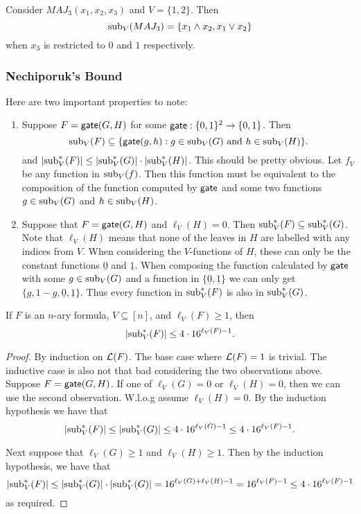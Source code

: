 \documentclass[11pt]{article}
\begin{document}
	\begin{example}
		Consider $MAJ_3(x_1, x_2, x_3)$ and $V = \{1, 2\}$. Then 
		\[\mathrm{sub}_V(MAJ_3) = \{x_1 \land x_2, x_1 \lor x_2\}\]
		when $x_3$ is restricted to $0$ and $1$ respectively. 
	\end{example}
	
	\subsubsection{Nechiporuk's Bound}
	Here are two important properties to note:
	\begin{enumerate}
		\item Suppose $F = \mathsf{gate}(G,H)$ for some $\mathsf{gate}: \{0,1\}^2 \rightarrow \{0,1\}$. Then 
		\[\mathrm{sub}_V(F) \subseteq \{\mathsf{gate}(g, h): g \in \mathrm{sub}_V(G) \mbox{ and } h \in \mathrm{sub}_V(H)\}.\]
		and $|\mathrm{sub}_V^*(F)| \leq |\mathrm{sub}_V^*(G)| \cdot |\mathrm{sub}_V^*(H)|$. This should be pretty obvious. Let $f_V$ be any function in $\mathrm{sub}_V(f)$. Then this function must be equivalent to the composition of the function computed by $\mathsf{gate}$ and some two functions $g \in \mathrm{sub}_V(G)$ and $h \in \mathrm{sub}_V(H)$.
		\item Suppose that $F = \mathsf{gate}(G, H)$ and $\ell_V(H) = 0$. Then $\mathrm{sub}_V^*(F) \subseteq \mathrm{sub}_V^*(G)$. Note that $\ell_V(H)$ means that none of the leaves in $H$ are labelled with any indices from $V$. When considering the $V$-functions of $H$, these can only be the constant functions $\underline{0}$ and $\underline{1}$. When composing the function calculated by $\mathsf{gate}$ with some $g \in \mathrm{sub}_V(G)$ and a function in $\{\underline{0}, \underline{1}\}$ we can only get $\{g, 1-g, \underline{0}, \underline{1}\}$. Thus every function in $\mathrm{sub}_V^*(F)$ is also in $\mathrm{sub}_V^{*}(G)$.
	\end{enumerate}
	
	\begin{lemma}
		\label{lem:U-Vsubfunctions}
		If $F$ is an $n$-ary formula, $V \subseteq [n]$, and $\ell_{V}(F) \geq 1$, then \[|\mathrm{sub}_V^*(F)| \leq 4 \cdot 16^{\ell_V(F) - 1}.\] 
	\end{lemma}
	\begin{proof}
		By induction on $\mathcal{L}(F)$. The base case where $\mathcal{L}(F) = 1$ is trivial. The inductive case is also not that bad considering the two observations above. Suppose $F = \mathsf{gate}(G, H)$. If one of $\ell_V(G) = 0$ or $\ell_V(H) = 0$, then we can use the second observation. W.l.o.g assume $\ell_V(H) = 0$. By the induction hypothesis we have that  
		\[|\mathrm{sub}_V^{*}(F)| \leq |\mathrm{sub}_V^*(G)| \leq 4 \cdot 16^{\ell_V(G) - 1} \leq 4 \cdot 16^{\ell_V(F) - 1}.\]
		
		Next suppose that $\ell_V(G) \geq 1$ and $\ell_V(H) \geq 1$. Then by the induction hypothesis, we have that 
		\[|\mathrm{sub}_V^{*}(F)| \leq |\mathrm{sub}_V^*(G)| \cdot |\mathrm{sub}_V^*(G)| = 16^{\ell_V(G) + \ell_V(H) - 1} = 16^{\ell_V(F) - 1}\leq 4 \cdot 16^{\ell_V(F) - 1}\]
		as required.
	\end{proof}
	
\end{document}
